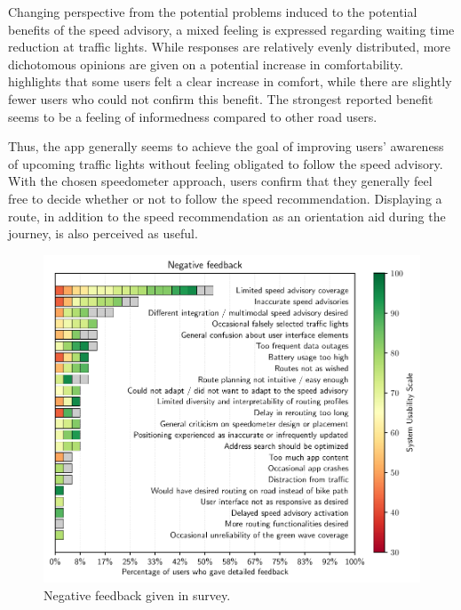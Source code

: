 Changing perspective from the potential problems induced to the potential benefits of the speed advisory, a mixed feeling is expressed regarding waiting time reduction at traffic lights. While responses are relatively evenly distributed, more dichotomous opinions are given on a potential increase in comfortability.  highlights that some users felt a clear increase in comfort, while there are slightly fewer users who could not confirm this benefit. The strongest reported benefit seems to be a feeling of informedness compared to other road users. 

Thus, the app generally seems to achieve the goal of improving users' awareness of upcoming traffic lights without feeling obligated to follow the speed advisory. With the chosen speedometer approach, users confirm that they generally feel free to decide whether or not to follow the speed recommendation. Displaying a route, in addition to the speed recommendation as an orientation aid during the journey, is also perceived as useful.

\begin{figure}[t]
\caption{Negative feedback given in survey.}\label{fig:app-negative-feedback}
\includegraphics[width=\linewidth]{images/app-feedback-negative.pdf}
\end{figure}

